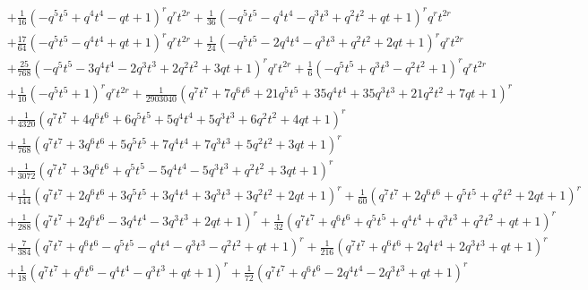 \documentclass[11pt,english]{amsart}
\numberwithin{equation}{section}
\numberwithin{figure}{section}
\theoremstyle{plain}
\theoremstyle{plain}
\theoremstyle{definition}
\theoremstyle{remark}
\begin{document}
{\begin{align*}
& + \frac{1}{16} {\left(-q^{5} t^{5} + q^{4} t^{4} - q t + 1\right)}^{r} q^{r}t^{2r} + \frac{1}{36} {\left(-q^{5} t^{5} - q^{4} t^{4} - q^{3} t^{3} + q^{2} t^{2} + q t + 1\right)}^{r} q^{r}t^{2r} \\
& + \frac{17}{64} {\left(-q^{5} t^{5} - q^{4} t^{4} + q t + 1\right)}^{r} q^{r}t^{2r} + \frac{1}{24} {\left(-q^{5} t^{5} - 2 q^{4} t^{4} - q^{3} t^{3} + q^{2} t^{2} + 2 q t + 1\right)}^{r} q^{r}t^{2r} \\
& + \frac{25}{768} {\left(-q^{5} t^{5} - 3 q^{4} t^{4} - 2 q^{3} t^{3} + 2 q^{2} t^{2} + 3 q t + 1\right)}^{r} q^{r}t^{2r} + \frac{1}{6} {\left(-q^{5} t^{5} + q^{3} t^{3} - q^{2} t^{2} + 1\right)}^{r} q^{r}t^{2r} \\
& + \frac{1}{10} {\left(-q^{5} t^{5} + 1\right)}^{r} q^{r}t^{2r} + \frac{1}{2903040} {\left(q^{7} t^{7} + 7 q^{6} t^{6} + 21 q^{5} t^{5} + 35 q^{4} t^{4} + 35 q^{3} t^{3} + 21 q^{2} t^{2} + 7 q t + 1\right)}^{r} \\
& + \frac{1}{4320} {\left(q^{7} t^{7} + 4 q^{6} t^{6} + 6 q^{5} t^{5} + 5 q^{4} t^{4} + 5 q^{3} t^{3} + 6 q^{2} t^{2} + 4 q t + 1\right)}^{r} \\
& + \frac{1}{768} {\left(q^{7} t^{7} + 3 q^{6} t^{6} + 5 q^{5} t^{5} + 7 q^{4} t^{4} + 7 q^{3} t^{3} + 5 q^{2} t^{2} + 3 q t + 1\right)}^{r} \\
& + \frac{1}{3072} {\left(q^{7} t^{7} + 3 q^{6} t^{6} + q^{5} t^{5} - 5 q^{4} t^{4} - 5 q^{3} t^{3} + q^{2} t^{2} + 3 q t + 1\right)}^{r} \\
& + \frac{1}{144} {\left(q^{7} t^{7} + 2 q^{6} t^{6} + 3 q^{5} t^{5} + 3 q^{4} t^{4} + 3 q^{3} t^{3} + 3 q^{2} t^{2} + 2 q t + 1\right)}^{r} + \frac{1}{60} {\left(q^{7} t^{7} + 2 q^{6} t^{6} + q^{5} t^{5} + q^{2} t^{2} + 2 q t + 1\right)}^{r} \\
& + \frac{1}{288} {\left(q^{7} t^{7} + 2 q^{6} t^{6} - 3 q^{4} t^{4} - 3 q^{3} t^{3} + 2 q t + 1\right)}^{r} + \frac{1}{32} {\left(q^{7} t^{7} + q^{6} t^{6} + q^{5} t^{5} + q^{4} t^{4} + q^{3} t^{3} + q^{2} t^{2} + q t + 1\right)}^{r} \\
& + \frac{7}{384} {\left(q^{7} t^{7} + q^{6} t^{6} - q^{5} t^{5} - q^{4} t^{4} - q^{3} t^{3} - q^{2} t^{2} + q t + 1\right)}^{r} + \frac{1}{216} {\left(q^{7} t^{7} + q^{6} t^{6} + 2 q^{4} t^{4} + 2 q^{3} t^{3} + q t + 1\right)}^{r} \\
& + \frac{1}{18} {\left(q^{7} t^{7} + q^{6} t^{6} - q^{4} t^{4} - q^{3} t^{3} + q t + 1\right)}^{r} + \frac{1}{72} {\left(q^{7} t^{7} + q^{6} t^{6} - 2 q^{4} t^{4} - 2 q^{3} t^{3} + q t + 1\right)}^{r} \\

\end{align*}}
\end{document}
